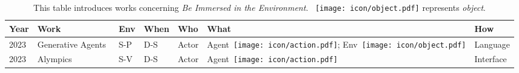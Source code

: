 
\begin{table}[ht]
  \caption{This table introduces works concerning \textit{Be Immersed in the Environment}. ~\texttt{[image: icon/object.pdf]} represents \textit{object}.}
  \label{tab:immerse}
  \begin{tabular}{lllllll}
    \toprule
    \textbf{Year}&\textbf{Work} & \textbf{Env}&\textbf{When} & \textbf{Who} & \textbf{What} & \textbf{How}\\
    \midrule
    2023&Generative Agents~\cite{10.1145/3586183.3606763} & S-P & D-S  & Actor &Agent~\texttt{[image: icon/action.pdf]};
Env~\texttt{[image: icon/object.pdf]}& Language\\
2023&Alympics~\cite{mao2024alympicsllmagentsmeet}&S-V & D-S  & Actor &Agent~\texttt{[image: icon/action.pdf]}&Interface\\
  \bottomrule
\end{tabular}
\end{table}
